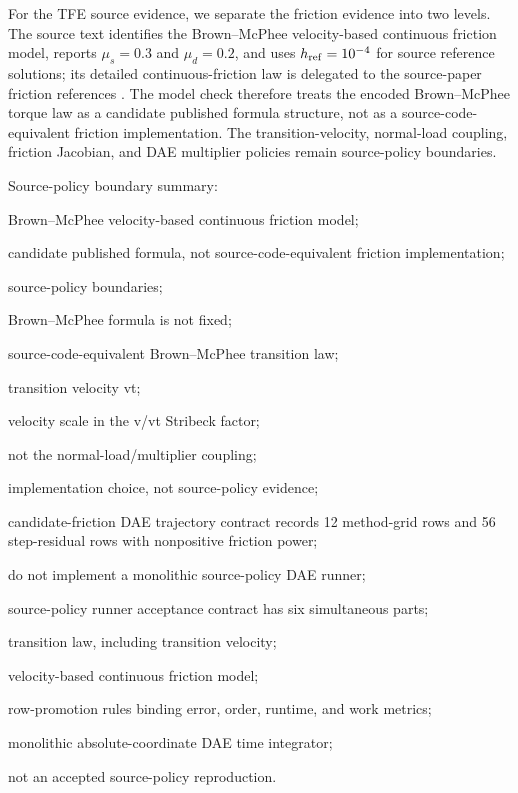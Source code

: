 \documentclass[preprint,12pt]{elsarticle}
\newcommand{\tfe}{TFE}
\begin{document}
For the \tfe{} source evidence, we separate the friction evidence into two
levels.  The source text identifies the Brown--McPhee velocity-based
continuous friction model, reports $\mu_s=0.3$ and $\mu_d=0.2$, and uses
$h_{\rm ref}=10^{-4}$ for source reference solutions; its detailed
continuous-friction law is delegated to the source-paper friction references
\cite{chaturvedi2026tfe,browmcphee2016friction}.  The model check therefore
treats the encoded Brown--McPhee torque law as a candidate published formula
structure, not as a source-code-equivalent friction implementation.  The
transition-velocity, normal-load coupling, friction Jacobian, and DAE
multiplier policies remain source-policy boundaries.

\noindent Source-policy boundary summary:\par
\noindent Brown--McPhee velocity-based continuous friction model;\par
\noindent candidate published formula, not source-code-equivalent friction implementation;\par
\noindent source-policy boundaries;\par
\noindent Brown--McPhee formula is not fixed;\par
\noindent source-code-equivalent Brown--McPhee transition law;\par
\noindent transition velocity vt;\par
\noindent velocity scale in the v/vt Stribeck factor;\par
\noindent not the normal-load/multiplier coupling;\par
\noindent implementation choice, not source-policy evidence;\par
\noindent candidate-friction DAE trajectory contract records 12 method-grid rows and 56 step-residual rows with nonpositive friction power;\par
\noindent do not implement a monolithic source-policy DAE runner;\par
\noindent source-policy runner acceptance contract has six simultaneous parts;\par
\noindent transition law, including transition velocity;\par
\noindent velocity-based continuous friction model;\par
\noindent row-promotion rules binding error, order, runtime, and work
metrics;\par
\noindent monolithic absolute-coordinate DAE time integrator;\par
\noindent not an accepted source-policy reproduction.\par
\end{document}
